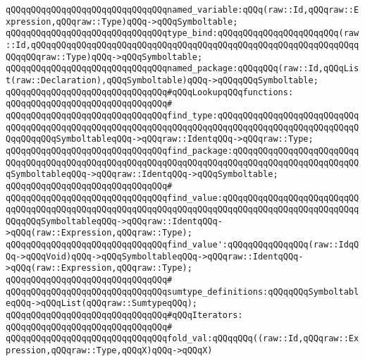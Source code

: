 \newline
\verb|qQQqqQQqqQQqqQQqqQQqqQQqqQQqqQQqnamed_variable:qQQq(raw::Id,qQQqraw::Expression,qQQqraw::Type)qQQq->qQQqSymboltable;|\newline
\verb|qQQqqQQqqQQqqQQqqQQqqQQqqQQqqQQqtype_bind:qQQqqQQqqQQqqQQqqQQqqQQq(raw::Id,qQQqqQQqqQQqqQQqqQQqqQQqqQQqqQQqqQQqqQQqqQQqqQQqqQQqqQQqqQQqqQQqqQQqqQQqraw::Type)qQQq->qQQqSymboltable;|\newline
\newline
\verb|qQQqqQQqqQQqqQQqqQQqqQQqqQQqqQQqnamed_package:qQQqqQQq(raw::Id,qQQqList(raw::Declaration),qQQqSymboltable)qQQq->qQQqqQQqSymboltable;|\newline
\newline
\verb|qQQqqQQqqQQqqQQqqQQqqQQqqQQqqQQq#qQQqLookupqQQqfunctions:|\newline
\verb|qQQqqQQqqQQqqQQqqQQqqQQqqQQqqQQq#|\newline
\verb|qQQqqQQqqQQqqQQqqQQqqQQqqQQqqQQqfind_type:qQQqqQQqqQQqqQQqqQQqqQQqqQQqqQQqqQQqqQQqqQQqqQQqqQQqqQQqqQQqqQQqqQQqqQQqqQQqqQQqqQQqqQQqqQQqqQQqqQQqqQQqqQQqSymboltableqQQq->qQQqraw::IdentqQQq->qQQqraw::Type;|\newline
\verb|qQQqqQQqqQQqqQQqqQQqqQQqqQQqqQQqfind_package:qQQqqQQqqQQqqQQqqQQqqQQqqQQqqQQqqQQqqQQqqQQqqQQqqQQqqQQqqQQqqQQqqQQqqQQqqQQqqQQqqQQqqQQqqQQqqQQqSymboltableqQQq->qQQqraw::IdentqQQq->qQQqSymboltable;|\newline
\verb|qQQqqQQqqQQqqQQqqQQqqQQqqQQqqQQq#|\newline
\verb|qQQqqQQqqQQqqQQqqQQqqQQqqQQqqQQqfind_value:qQQqqQQqqQQqqQQqqQQqqQQqqQQqqQQqqQQqqQQqqQQqqQQqqQQqqQQqqQQqqQQqqQQqqQQqqQQqqQQqqQQqqQQqqQQqqQQqqQQqqQQqSymboltableqQQq->qQQqraw::IdentqQQq->qQQq(raw::Expression,qQQqraw::Type);|\newline
\verb|qQQqqQQqqQQqqQQqqQQqqQQqqQQqqQQqfind_value':qQQqqQQqqQQqqQQq(raw::IdqQQq->qQQqVoid)qQQq->qQQqSymboltableqQQq->qQQqraw::IdentqQQq->qQQq(raw::Expression,qQQqraw::Type);|\newline
\verb|qQQqqQQqqQQqqQQqqQQqqQQqqQQqqQQq#|\newline
\verb|qQQqqQQqqQQqqQQqqQQqqQQqqQQqqQQqsumtype_definitions:qQQqqQQqSymboltableqQQq->qQQqList(qQQqraw::SumtypeqQQq);|\newline
\newline
\verb|qQQqqQQqqQQqqQQqqQQqqQQqqQQqqQQq#qQQqIterators:|\newline
\verb|qQQqqQQqqQQqqQQqqQQqqQQqqQQqqQQq#|\newline
\verb|qQQqqQQqqQQqqQQqqQQqqQQqqQQqqQQqfold_val:qQQqqQQq((raw::Id,qQQqraw::Expression,qQQqraw::Type,qQQqX)qQQq->qQQqX)|\newline
